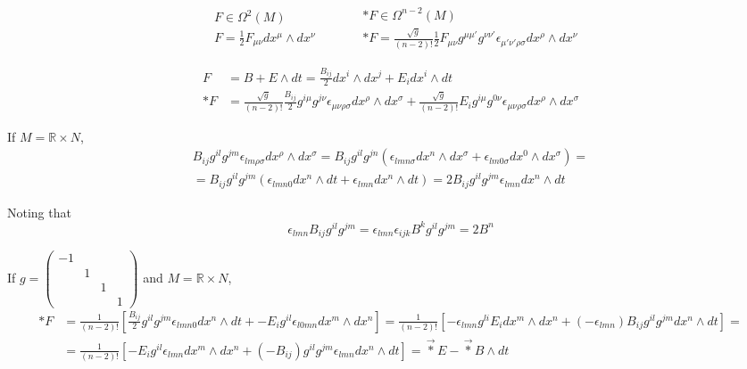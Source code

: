 \documentclass[10pt]{amsart}
\begin{document}
\begin{multicols*}{2}
\[
\begin{aligned}
  & F \in \Omega^2(M) \\ 
  & F = \frac{1}{2} F_{\mu \nu} dx^{\mu} \wedge dx^{\nu}
\end{aligned} \quad \quad \, 
\begin{aligned}
  & *F \in \Omega^{n-2}(M) \\ 
  & *F = \frac{\sqrt{g}}{ (n-2)!} \frac{1}{2} F_{\mu \nu} g^{\mu \mu'} g^{\nu \nu'} \epsilon_{\mu' \nu' \rho \sigma } dx^{\rho} \wedge dx^{\nu} 
\end{aligned}
\]

\[
\begin{aligned}
  F & = B + E \wedge dt = \frac{B_{ij}}{2} dx^i \wedge dx^j + E_i dx^i \wedge dt \\ 
*F & = \frac{ \sqrt{g}}{(n-2)!} \frac{B_{ij}}{2} g^{i \mu } g^{j \nu} \epsilon_{\mu \nu \rho \sigma } dx^{\rho} \wedge dx^{\sigma} +   \frac{ \sqrt{g}}{ (n-2)!} E_i g^{i\mu} g^{0\nu} \epsilon_{\mu \nu \rho \sigma} dx^{\rho} \wedge dx^{\sigma}
\end{aligned}
\]

If $M = \mathbb{R}\times N$, 
\[
\begin{gathered}
  B_{ij} g^{il}g^{jm} \epsilon_{lm\rho \sigma} dx^{\rho} \wedge dx^{\sigma} = B_{ij} g^{il}g^{jn} (\epsilon_{lmn\sigma} dx^n \wedge dx^{\sigma} + \epsilon_{lm0\sigma} dx^0 \wedge dx^{\sigma} ) = \\
  = B_{ij} g^{il} g^{jm} (\epsilon_{lmn0} dx^n \wedge dt + \epsilon_{lmn} dx^n \wedge dt) = 2B_{ij} g^{il} g^{jm} \epsilon_{lmn} dx^n \wedge dt
\end{gathered}
\]

Noting that 
\[
\epsilon_{lmn} B_{ij} g^{il} g^{jm} = \epsilon_{lmn} \epsilon_{ijk} B^k g^{il} g^{jm} = 2B^n
\]


If $g= \left( \begin{matrix} -1  & & & \\
  & 1 & & \\
  &  & 1 & \\
  & & & 1 \end{matrix} \right)$ and $M = \mathbb{R} \times N$, 
\[
\begin{aligned}
  *F & = \frac{1}{ (n-2)!} \left[ \frac{B_{ij}}{2} g^{il }g^{jm} \epsilon_{lmn0} dx^n \wedge dt + -E_i g^{il} \epsilon_{l0mn} dx^m \wedge dx^n \right] = \frac{1}{(n-2)!} \left[ -\epsilon_{lmn} g^{li} E_i dx^m \wedge dx^n + (-\epsilon_{lmn})B_{ij} g^{il} g^{jm} dx^n \wedge dt \right] = \\
  & = \frac{1}{(n-2)!} \left[ -E_i g^{il} \epsilon_{lmn} dx^m \wedge dx^n + (-B_{ij}) g^{il} g^{jm} \epsilon_{lmn} dx^n \wedge dt \right] = \vec{*} E - \vec{*}B \wedge dt
\end{aligned}
\]


\end{multicols*}
\end{document}
